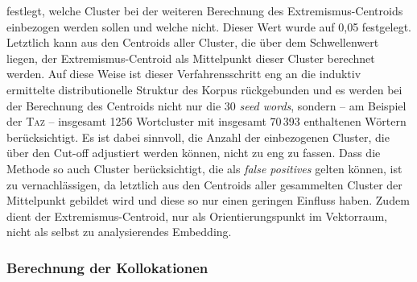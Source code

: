 festlegt, welche Cluster bei der weiteren Berechnung des Extremismus-Centroids einbezogen werden sollen und welche nicht. Dieser Wert wurde auf 0,05 festgelegt. Letztlich kann aus den Centroids aller Cluster, die über dem Schwellenwert liegen, der Extremismus-Centroid als Mittelpunkt dieser Cluster berechnet werden. Auf diese Weise ist dieser Verfahrensschritt eng an die induktiv ermittelte distributionelle Struktur des Korpus rückgebunden und es werden bei der Berechnung des Centroids nicht nur die 30 \emph{seed words}, sondern -- am Beispiel der \textsc{Taz} -- insgesamt 1256 Wortcluster mit insgesamt 70\,393 enthaltenen Wörtern berücksichtigt. Es ist dabei sinnvoll, die Anzahl der einbezogenen Cluster, die über den Cut-off adjustiert werden können, nicht zu eng zu fassen. Dass die Methode so auch Cluster berücksichtigt, die als \emph{false positives} gelten können, ist zu vernachlässigen, da letztlich aus den Centroids aller gesammelten Cluster der Mittelpunkt gebildet wird und diese so nur einen geringen Einfluss haben. Zudem dient der Extremismus-Centroid, nur als Orientierungspunkt im Vektorraum, nicht als selbst zu analysierendes Embedding.

\subsubsection{Berechnung der Kollokationen}\label{berechnung-der-kollokationen}

